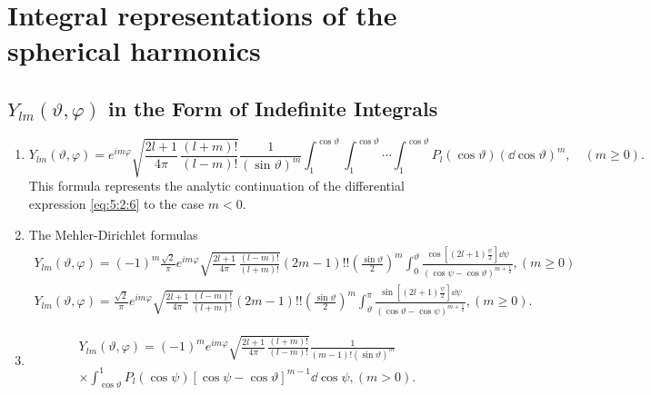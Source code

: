 \section{Integral representations of the spherical harmonics \cite{ref004,ref022,ref027}}\label{sec:5.3}
\subsection{$Y_{l m}(\vartheta, \varphi)$ in the Form of Indefinite Integrals}\label{sec:5.3.1}
\begin{enumerate}[label=(\alph*)]
\item
\begin{equation}
Y_{l m}(\vartheta, \varphi)=e^{i m \varphi} \sqrt{\frac{2 l+1}{4 \pi} \, \frac{(l+m)!}{(l-m)!}} \frac{1}{(\sin \vartheta)^{m}} \int_{1}^{\cos \vartheta} \int_{1}^{\cos \vartheta} \cdots \int_{1}^{\cos \vartheta} P_{l}(\cos \vartheta)(\dd \cos \vartheta)^{m}, \quad(m \geq 0) . \label{eq:5:3:1}
\end{equation}
This formula represents the analytic continuation of the differential expression \eqref{eq:5:2:6} to the case $m<0$.\\
\item The Mehler-Dirichlet formulas
\begin{gather}
Y_{l m}(\vartheta, \varphi)=(-1)^{m} \frac{\sqrt{2}}{\pi} e^{i m \varphi} \sqrt{\frac{2 l+1}{4 \pi} \, \frac{(l-m)!}{(l+m)!}}(2 m-1)!!\left(\frac{\sin \vartheta}{2}\right)^{m} \int_{0}^{\vartheta} \frac{\cos \left[(2 l+1) \frac{\psi}{2}\right] \dd \psi}{(\cos \psi-\cos \vartheta)^{m+\frac{1}{2}}},(m \geq 0)  \label{eq:5:3:2}\\
Y_{l m}(\vartheta, \varphi)=\frac{\sqrt{2}}{\pi} e^{i m \varphi} \sqrt{\frac{2 l+1}{4 \pi} \, \frac{(l-m)!}{(l+m)!}}(2 m-1)!!\left(\frac{\sin \vartheta}{2}\right)^{m} \int_{\vartheta}^{\pi} \frac{\sin \left[(2 l+1) \frac{\psi}{2}\right] \dd \psi}{(\cos \vartheta-\cos \psi)^{m+\frac{1}{2}}},(m \geq 0). \label{eq:5:3:3}
\end{gather}
\item
\begin{multline}
Y_{l m}(\vartheta, \varphi)=  (-1)^{m} e^{i m \varphi} \sqrt{\frac{2 l+1}{4 \pi} \, \frac{(l+m)!}{(l-m)!}} \frac{1}{(m-1)!(\sin \vartheta)^{m}}  %
\\
 \times \int_{\cos \vartheta}^{1} P_{l}(\cos \psi)[\cos \psi-\cos \vartheta]^{m-1} \dd \cos \psi,(m>0) .\label{eq:5:3:4}
\end{multline}
\end{enumerate}
